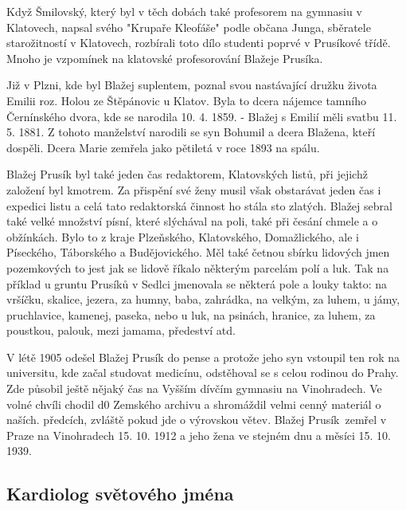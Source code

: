 \documentclass[../dejiny-rodu-prusiku.tex]{subfiles}
\begin{document}
Když Šmilovský, který byl v těch dobách také profesorem na gymnasiu v Klatovech, napsal svého "Krupaře Kleofáše" podle občana Junga, sběratele starožitností v Klatovech, rozbírali toto dílo studenti poprvé v Prusíkové třídě. Mnoho je vzpomínek na klatovské profesorování Blažeje Prusíka.

Již v Plzni, kde byl Blažej suplentem, poznal svou nastávající družku života Emilii roz. Holou ze Štěpánovic u Klatov. Byla to dcera nájemce tamního Černínského dvora, kde se narodila 10. 4. 1859. - Blažej s Emilií měli svatbu 11. 5. 1881. Z tohoto manželství narodili se syn Bohumil a dcera Blažena, kteří dospěli. Dcera Marie zemřela jako pětiletá v roce 1893 na spálu.

Blažej Prusík byl také jeden čas redaktorem, Klatovských listů, při jejichž založení byl kmotrem. Za přispění své ženy musil však obstarávat jeden čas i expedici listu a celá tato redaktorská činnost ho stála sto zlatých. Blažej sebral také velké množství písní, které slýchával na poli, také při česání chmele a o obžínkách. Bylo to z kraje Plzeňského, Klatovského, Domažlického, ale i Píseckého, Táborského a Budějovického. Měl také četnou sbírku lidových jmen pozemkových to jest jak se lidově říkalo některým parcelám polí a luk. Tak na příklad u gruntu Prusíků v Sedlci jmenovala se některá pole a louky takto: na vršíčku, skalice, jezera, za humny, baba, zahrádka, na velkým, za luhem, u jámy,  pruchlavice, kamenej, paseka, nebo u luk, na psinách, hranice, za luhem, za poustkou, palouk, mezi jamama, předeství atd.

V létě 1905 odešel Blažej Prusík do pense a protože jeho syn vstoupil ten rok na universitu, kde začal studovat medicínu, odstěhoval se s celou rodinou do Prahy. Zde působil ještě nějaký čas na Vyšším dívčím gymnasiu na Vinohradech. Ve volné chvíli chodil d0 Zemského archivu a shromáždil velmi cenný materiál o naších. předcích, zvláště pokud jde o výrovskou větev. Blažej Prusík zemřel v Praze na Vinohradech 15. 10. 1912 a jeho žena ve stejném dnu a měsíci 15. 10. 1939.

\subsection{Kardiolog světového jména}
\end{document}
